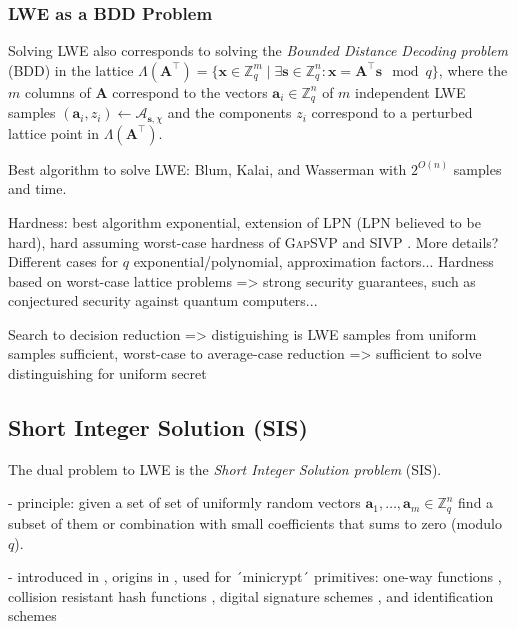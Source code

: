 \documentclass[
  a4paper,  %
  twoside,  %
  bibliography=totoc,
  headsepline,
  cleardoublepage=empty,
  parskip=half,
  draft=false
]{scrbook}
\begin{document}
\subsubsection{LWE as a BDD Problem} \label{sec:lwe-bdd} %
Solving LWE also corresponds to solving the \textit{Bounded Distance Decoding problem} (BDD) in the lattice $\Lambda(\mathbf{A}^\intercal) = \{ \mathbf{x} \in \mathbb{Z}_q^m \mid \exists \mathbf{s} \in \mathbb{Z}_q^n : \mathbf{x} = \mathbf{A}^\intercal \mathbf{s}  \mod q \}$, where the $m$ columns of $\mathbf{A}$ correspond to the vectors $\mathbf{a}_i \in \mathbb{Z}_q^n$ of $m$ independent LWE samples $(\mathbf{a}_i, z_i) \leftarrow \mathcal{A}_{\mathbf{s}, \chi}$ and the components $z_i$ correspond to a perturbed lattice point in $\Lambda(\mathbf{A}^\intercal)$. %



Best algorithm to solve LWE: Blum, Kalai, and Wasserman \cite{BKW03} with $2^{O(n)}$ samples and time. %

Hardness: best algorithm exponential, extension of LPN (LPN believed to be hard), hard assuming worst-case hardness of \textsc{GapSVP} %
and \textsc{SIVP} \cite{Reg05, Pei09}. More details? Different cases for $q$ exponential/polynomial, approximation factors...
Hardness based on worst-case lattice problems => strong security guarantees, such as conjectured security against quantum computers...
 
Search to decision reduction => distiguishing is LWE samples from uniform samples sufficient, worst-case to average-case reduction => sufficient to solve distinguishing for uniform secret

\subsection{Short Integer Solution (SIS)}
The dual problem to LWE is the \textit{Short Integer Solution problem} (SIS).

- principle: given a set of set of uniformly random vectors $\mathbf{a}_1, \ldots, \mathbf{a}_m \in \mathbb{Z}_q^n$ find a subset of them or combination with small coefficients that sums to zero (modulo $q$). %

- introduced in \cite{MR04}, origins in \cite{Ajt96}, used for ´minicrypt´ primitives: one-way functions \cite{Ajt96}, collision resistant hash functions \cite{GGH96}, digital signature schemes \cite{GPV08, CHKP10}, and identification schemes \cite{MV03, Lyu08, KTX07} %
\end{document}
